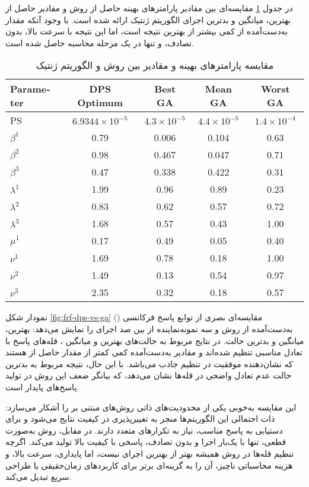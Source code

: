 در جدول \ref{tab:DPS-vs-GA} مقایسه‌ای بین مقادیر پارامترهای بهینه حاصل از روش  و مقادیر حاصل از بهترین، میانگین و بدترین اجرای الگوریتم ژنتیک ارائه شده است. با وجود آنکه مقدار  به‌دست‌آمده از  کمی بیشتر از بهترین نتیجه  است، اما این نتیجه با سرعت بالا، بدون تصادف، و تنها در یک مرحله محاسبه حاصل شده است.

\begin{table}[H]
\centering
\caption{مقایسه پارامترهای بهینه و مقادیر  بین روش  و الگوریتم ژنتیک}
\label{tab:DPS-vs-GA}
\begin{latin}
\begin{tabular}{lcccc}
\hline
\textbf{Parameter} & \textbf{DPS Optimum} & \textbf{Best GA} & \textbf{Mean GA} & \textbf{Worst GA} \\
\hline
PS & $6.9344 \times 10^{-5}$ & $4.3 \times 10^{-5}$ & $4.4 \times 10^{-5}$ & $1.4 \times 10^{-4}$ \\
\hline
$\beta^1$ & 0.79 & 0.006 & 0.104 & 0.63 \\
$\beta^2$ & 0.98 & 0.467 & 0.047 & 0.71 \\
$\beta^3$ & 0.47 & 0.338 & 0.422 & 0.31 \\
$\lambda^1$ & 1.99 & 0.96 & 0.89 & 0.23 \\
$\lambda^2$ & 0.83 & 0.62 & 0.57 & 0.72 \\
$\lambda^3$ & 1.68 & 0.57 & 0.43 & 1.00 \\
$\mu^1$ & 0.17 & 0.49 & 0.05 & 0.40 \\
$\nu^1$ & 1.69 & 0.78 & 0.18 & 1.00 \\
$\nu^2$ & 1.49 & 0.13 & 0.54 & 0.97 \\
$\nu^3$ & 2.35 & 0.32 & 0.18 & 0.57 \\
\hline
\end{tabular}
\end{latin}
\end{table}

نمودار شکل \ref{fig:frf-dps-vs-ga} مقایسه‌ای بصری از توابع پاسخ فرکانسی () به‌دست‌آمده از روش  و سه نمونه‌نماینده از بین صد اجرای  را نمایش می‌دهد: بهترین، میانگین و بدترین حالت. در نتایج مربوط به حالت‌های بهترین و میانگین ، قله‌های پاسخ با تعادل مناسبی تنظیم شده‌اند و مقادیر  به‌دست‌آمده کمی کمتر از مقدار حاصل از  هستند که نشان‌دهنده موفقیت در تنظیم جاذب می‌باشد. با این حال، نتیجه مربوط به بدترین حالت  عدم تعادل واضحی در قله‌ها نشان می‌دهد، که بیانگر ضعف این روش در تولید پاسخ‌های پایدار است.

این مقایسه به‌خوبی یکی از محدودیت‌های ذاتی روش‌های مبتنی بر  را آشکار می‌سازد: ذات احتمالی این الگوریتم‌ها منجر به تغییرپذیری در کیفیت نتایج می‌شود و برای دستیابی به پاسخ مناسب، نیاز به تکرارهای متعدد دارند. در مقابل، روش  به‌صورت قطعی، تنها با یک‌بار اجرا و بدون تصادف، پاسخی با کیفیت بالا تولید می‌کند. اگرچه تنظیم قله‌ها در روش  همیشه بهتر از بهترین اجرای  نیست، اما پایداری، سرعت بالا، و هزینه محاسباتی ناچیز، آن را به گزینه‌ای برتر برای کاربردهای زمان‌حقیقی یا طراحی سریع تبدیل می‌کند.

